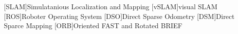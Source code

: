 [SLAM]{Simulatanious Localization and Mapping}
[vSLAM]{visual SLAM}
[ROS]{Roboter Operating System}
[DSO]{Direct Sparse Odometry}
[DSM]{Direct Sparce Mapping}
[ORB]{Oriented FAST and Rotated BRIEF}


